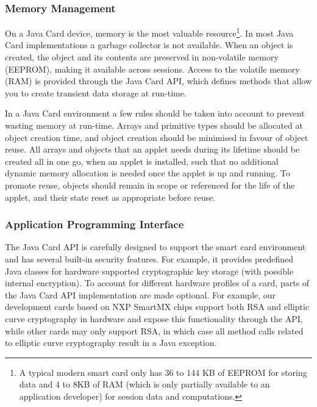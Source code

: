 \subsubsection{Memory Management}

On a Java Card device, memory is the most valuable resource\footnote{A typical 
modern smart card only has 36 to 144 KB of EEPROM for storing data and 4 to 8KB
of RAM (which is only partially available to an application developer) for
session data and computations.}. In most Java Card implementations a garbage
collector is not available. When an object is created, the object and its
contents are preserved in non-volatile 
memory (EEPROM), making it available 
across sessions. Access to the volatile memory 
(RAM) is provided through the Java Card API, which defines methods 
that allow you to create transient data storage at run-time.

In a Java Card environment a few rules should be taken into account to prevent
wasting memory at run-time. Arrays and primitive types should be allocated at
object creation time, and object creation should be minimised in favour of
object reuse. All arrays and objects that an applet needs during its lifetime 
should be created all in one go, when an applet is installed, such that no 
additional dynamic memory allocation is needed once the applet is up and 
running. To promote reuse, objects should remain in scope or referenced for the
life of the applet, and their state reset as appropriate before reuse.

\subsubsection{Application Programming Interface}

The Java Card API is carefully designed to support the
smart card environment and has several built-in security features. For example,
it provides predefined Java classes for hardware supported cryptographic key
storage (with possible internal encryption). To account for different hardware
profiles of a card, parts of the Java Card API implementation are made optional.
For example, our development cards based on NXP SmartMX chips support both RSA
 and elliptic curve cryptography in hardware and expose this functionality through the API, while
other cards may only support RSA, in which case all method calls related to
elliptic curve cryptography result in a Java exception.


